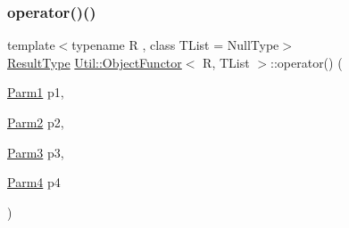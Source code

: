 \mbox{\label{classUtil_1_1ObjectFunctor_a87c6264782e6c535c3a66f385d922f12}} 
\subsubsection{\texorpdfstring{operator()()}{operator()()}\hspace{0.1cm}{\footnotesize\ttfamily [15/18]}}
{\footnotesize\ttfamily template$<$typename R , class T\+List  = Null\+Type$>$ \\
\mbox{\hyperlink{classUtil_1_1ObjectFunctor_a77f816e98108848347d0dfc085090a1c}{Result\+Type}} \mbox{\hyperlink{classUtil_1_1ObjectFunctor}{Util\+::\+Object\+Functor}}$<$ R, T\+List $>$\+::operator() (\begin{DoxyParamCaption}\item[{\mbox{\hyperlink{classUtil_1_1ObjectFunctor_a199715d28029627c2ae7219c13b04d26}{Parm1}}}]{p1,  }\item[{\mbox{\hyperlink{classUtil_1_1ObjectFunctor_a6809cf65883dc7575e01d9b9849649cf}{Parm2}}}]{p2,  }\item[{\mbox{\hyperlink{classUtil_1_1ObjectFunctor_a6becd26610c6091b9ba93cd96f3def66}{Parm3}}}]{p3,  }\item[{\mbox{\hyperlink{classUtil_1_1ObjectFunctor_a54ce0b64981cd7f558ce8eea7df3f1b2}{Parm4}}}]{p4 }\end{DoxyParamCaption})\hspace{0.3cm}{\ttfamily [inline]}}

\mbox{\label{classUtil_1_1ObjectFunctor_a95b7e08a92f54e2ce8a90153c1414abd}} 
